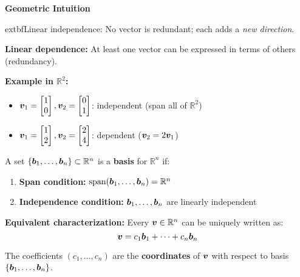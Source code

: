 \begin{intuitionbox}
    \textbf{Geometric Intuition}

    	extbf{Linear independence:} No vector is redundant; each adds a \emph{new direction}.

    \textbf{Linear dependence:} At least one vector can be expressed in terms of others (redundancy).

    \textbf{Example in $\mathbb{R}^2$:}
    \begin{itemize}
        \item $\bm{v}_1 = \begin{bmatrix} 1 \\ 0 \end{bmatrix}, \bm{v}_2 = \begin{bmatrix} 0 \\ 1 \end{bmatrix}$: independent (span all of $\mathbb{R}^2$)
        \item $\bm{v}_1 = \begin{bmatrix} 1 \\ 2 \end{bmatrix}, \bm{v}_2 = \begin{bmatrix} 2 \\ 4 \end{bmatrix}$: dependent ($\bm{v}_2 = 2\bm{v}_1$)
    \end{itemize}
\end{intuitionbox}

\begin{definition}[Basis]
    \label{def:basis}
    A set $\{\bm{b}_1, \ldots, \bm{b}_n\} \subset \mathbb{R}^n$ is a \textbf{basis} for $\mathbb{R}^n$ if:
    \begin{enumerate}
        \item \textbf{Span condition:} $\text{span}(\bm{b}_1, \ldots, \bm{b}_n) = \mathbb{R}^n$
        \item \textbf{Independence condition:} $\bm{b}_1, \ldots, \bm{b}_n$ are linearly independent
    \end{enumerate}

    \textbf{Equivalent characterization:} Every $\bm{v} \in \mathbb{R}^n$ can be uniquely written as:
    \[
        \bm{v} = c_1\bm{b}_1 + \cdots + c_n\bm{b}_n
    \]

    The coefficients $(c_1, \ldots, c_n)$ are the \textbf{coordinates} of
    $\bm{v}$ with respect to basis $\{\bm{b}_1, \ldots, \bm{b}_n\}$.
\end{definition}


